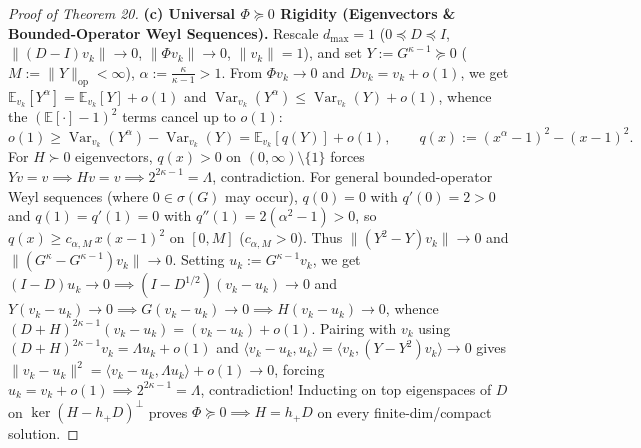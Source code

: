 \documentclass[10pt,letterpaper]{article}
\newcommand{\op}{\mathrm{op}}
\newcommand{\Var}{\operatorname{Var}}
\begin{document}
\begin{proof}[Proof of Theorem 20]
\textbf{(c) Universal $\Phi \succeq 0$ Rigidity (Eigenvectors \& Bounded-Operator Weyl Sequences).}
Rescale $d_{\max} = 1$ ($0 \preceq D \preceq I$, $\|(D-I)v_k\| \to 0$, $\|\Phi v_k\| \to 0$, $\|v_k\| = 1$), and set $Y := G^{\kappa-1} \succeq 0$ ($M := \|Y\|_{\op} < \infty$), $\alpha := \frac{\kappa}{\kappa-1} > 1$. From $\Phi v_k \to 0$ and $D v_k = v_k + o(1)$, we get $\mathbb{E}_{v_k}[Y^\alpha] = \mathbb{E}_{v_k}[Y] + o(1)$ and $\Var_{v_k}(Y^\alpha) \le \Var_{v_k}(Y) + o(1)$, whence the $(\mathbb{E}[\cdot] - 1)^2$ terms cancel up to $o(1)$:
\[
  o(1) \ge \Var_{v_k}(Y^\alpha) - \Var_{v_k}(Y) = \mathbb{E}_{v_k}[q(Y)] + o(1),
  \qquad q(x) := (x^\alpha - 1)^2 - (x - 1)^2.
\]
For $H \succ 0$ eigenvectors, $q(x) > 0$ on $(0, \infty)\setminus\{1\}$ forces $Yv = v \implies Hv = v \implies 2^{2\kappa-1} = \Lambda$, contradiction. For general bounded-operator Weyl sequences (where $0 \in \sigma(G)$ may occur), $q(0) = 0$ with $q'(0) = 2 > 0$ and $q(1) = q'(1) = 0$ with $q''(1) = 2(\alpha^2 - 1) > 0$, so $q(x) \ge c_{\alpha,M}\,x(x-1)^2$ on $[0, M]$ ($c_{\alpha,M} > 0$). Thus $\|(Y^2 - Y)v_k\| \to 0$ and $\|(G^\kappa - G^{\kappa-1})v_k\| \to 0$. Setting $u_k := G^{\kappa-1}v_k$, we get $(I-D)u_k \to 0 \implies (I-D^{1/2})(v_k - u_k) \to 0$ and $Y(v_k - u_k) \to 0 \implies G(v_k - u_k) \to 0 \implies H(v_k - u_k) \to 0$, whence $(D+H)^{2\kappa-1}(v_k - u_k) = (v_k - u_k) + o(1)$. Pairing with $v_k$ using $(D+H)^{2\kappa-1}v_k = \Lambda u_k + o(1)$ and $\langle v_k - u_k, u_k\rangle = \langle v_k, (Y - Y^2)v_k\rangle \to 0$ gives $\|v_k - u_k\|^2 = \langle v_k - u_k, \Lambda u_k\rangle + o(1) \to 0$, forcing $u_k = v_k + o(1) \implies 2^{2\kappa-1} = \Lambda$, contradiction! Inducting on top eigenspaces of $D$ on $\ker(H - h_+ D)^\perp$ proves $\Phi \succeq 0 \implies H = h_+ D$ on every finite-dim/compact solution.


\end{proof}
\end{document}
